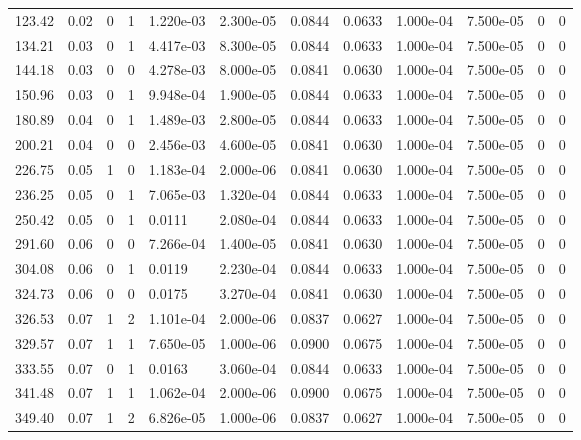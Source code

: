 \documentclass[preview]{standalone}
\begin{document}
{{\begin{tabular}{L{1.2cm}C{1.2cm} C{0.3cm}C{0.5cm} C{1.4cm}C{1.4cm} C{1.4cm}C{1.4cm} C{1.6cm}C{1.6cm} C{1.6cm}C{1.6cm}}
  123.42  &  0.02  & 0     &  1 &  1.220e-03  & 2.300e-05  &  0.0844&   0.0633& 1.000e-04 & 7.500e-05   &  0 & 0  \\ 
  134.21  &  0.03  & 0     &  1 &  4.417e-03  & 8.300e-05  &  0.0844&   0.0633& 1.000e-04 & 7.500e-05   &  0 & 0  \\ 
  144.18  &  0.03  & 0     &  0 &  4.278e-03  & 8.000e-05  &  0.0841&   0.0630& 1.000e-04 & 7.500e-05   &  0 & 0  \\ 
  150.96  &  0.03  & 0     &  1 &  9.948e-04  & 1.900e-05  &  0.0844&   0.0633& 1.000e-04 & 7.500e-05   &  0 & 0  \\ 
  180.89  &  0.04  & 0     &  1 &  1.489e-03  & 2.800e-05  &  0.0844&   0.0633& 1.000e-04 & 7.500e-05   &  0 & 0  \\ 
  200.21  &  0.04  & 0     &  0 &  2.456e-03  & 4.600e-05  &  0.0841&   0.0630& 1.000e-04 & 7.500e-05   &  0 & 0  \\ 
  226.75  &  0.05  & 1     &  0 &  1.183e-04  & 2.000e-06  &  0.0841&   0.0630& 1.000e-04 & 7.500e-05   &  0 & 0  \\ 
  236.25  &  0.05  & 0     &  1 &  7.065e-03  & 1.320e-04  &  0.0844&   0.0633& 1.000e-04 & 7.500e-05   &  0 & 0  \\ 
  250.42  &  0.05  & 0     &  1 &  0.0111  & 2.080e-04  &  0.0844&   0.0633& 1.000e-04 & 7.500e-05   &  0 & 0  \\ 
  291.60  &  0.06  & 0     &  0 &  7.266e-04  & 1.400e-05  &  0.0841&   0.0630& 1.000e-04 & 7.500e-05   &  0 & 0  \\ 
  304.08  &  0.06  & 0     &  1 &  0.0119  & 2.230e-04  &  0.0844&   0.0633& 1.000e-04 & 7.500e-05   &  0 & 0  \\ 
  324.73  &  0.06  & 0     &  0 &  0.0175  & 3.270e-04  &  0.0841&   0.0630& 1.000e-04 & 7.500e-05   &  0 & 0  \\ 
  326.53  &  0.07  & 1     &  2 &  1.101e-04  & 2.000e-06  &  0.0837&   0.0627& 1.000e-04 & 7.500e-05   &  0 & 0  \\ 
  329.57  &  0.07  & 1     &  1 &  7.650e-05  & 1.000e-06  &  0.0900&   0.0675& 1.000e-04 & 7.500e-05   &  0 & 0  \\ 
  333.55  &  0.07  & 0     &  1 &  0.0163  & 3.060e-04  &  0.0844&   0.0633& 1.000e-04 & 7.500e-05   &  0 & 0  \\ 
  341.48  &  0.07  & 1     &  1 &  1.062e-04  & 2.000e-06  &  0.0900&   0.0675& 1.000e-04 & 7.500e-05   &  0 & 0  \\ 
  349.40  &  0.07  & 1     &  2 &  6.826e-05  & 1.000e-06  &  0.0837&   0.0627& 1.000e-04 & 7.500e-05   &  0 & 0  \\ 

\end{tabular}}}
\end{document}
